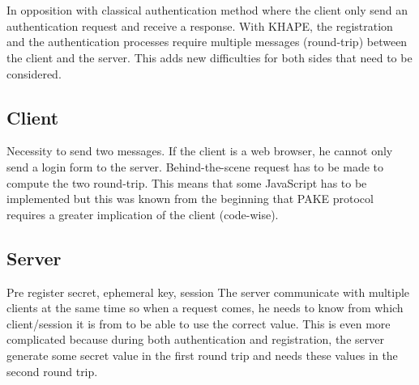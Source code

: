﻿\documentclass[../report.tex]{subfiles}
\begin{document}
% 
% 
% 
% 
% 
% 
% 
% 


\section{}
In opposition with classical authentication method where the client only send an authentication request and receive a response. With KHAPE, the registration and the authentication processes require multiple messages (round-trip) between the client and the server.
This adds new difficulties for both sides that need to be considered.
\subsection{Client}
Necessity to send two messages. If the client is a web browser, he cannot only send a login form to the server. Behind-the-scene request has to be made to compute the two round-trip. This means that some JavaScript has to be implemented but this was known from the beginning that PAKE protocol requires a greater implication of the client (code-wise).
\subsection{Server}
Pre register secret, ephemeral key, session
The server communicate with multiple clients at the same time so when a request comes, he needs to know from which client/session it is from to be able to use the correct value. This is even more complicated because during both authentication and registration, the server generate some secret value in the first round trip and needs these values in the second round trip.
\end{document}
